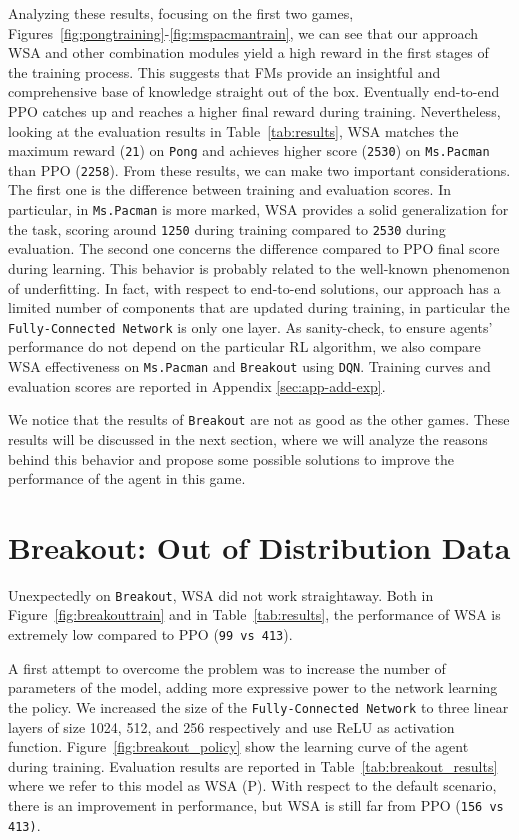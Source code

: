 Analyzing these results, focusing on the first two games, Figures~\ref{fig:pongtraining}-\ref{fig:mspacmantrain}, we can see that our approach WSA and other combination modules yield a high reward in the first stages of the training process.
This suggests that FMs provide an insightful and comprehensive base of knowledge straight out of the box.
Eventually end-to-end PPO catches up and reaches a higher final reward during training.
Nevertheless, looking at the evaluation results in Table~\ref{tab:results}, WSA matches the maximum reward (\texttt{21}) on \texttt{Pong} and achieves higher score (\texttt{2530}) on \texttt{Ms.Pacman} than PPO (\texttt{2258}).
From these results, we can make two important considerations.
The first one is the difference between training and evaluation scores.
In particular, in \texttt{Ms.Pacman} is more marked, WSA provides a solid generalization for the task, scoring around \texttt{1250} during training compared to \texttt{2530} during evaluation.
The second one concerns the difference compared to PPO final score during learning.
This behavior is probably related to the well-known phenomenon of underfitting.
In fact, with respect to end-to-end solutions, our approach has a limited number of components that are updated during training, in particular the \texttt{Fully-Connected Network} is only one layer.
As sanity-check, to ensure agents' performance do not depend on the particular RL algorithm, we also compare WSA effectiveness on \texttt{Ms.Pacman} and \texttt{Breakout} using \texttt{DQN}.
Training curves and evaluation scores are reported in Appendix \ref{sec:app-add-exp}.

We notice that the results of \texttt{Breakout} are not as good as the other games.
These results will be discussed in the next section, where we will analyze the reasons behind this behavior and propose some possible solutions to improve the performance of the agent in this game.



\section{Breakout: Out of Distribution Data}\label{sec:breakout_study}
Unexpectedly on \texttt{Breakout}, WSA did not work straightaway.
Both in Figure~\ref{fig:breakouttrain} and in Table~\ref{tab:results}, the performance of WSA is extremely low compared to PPO (\texttt{99 vs 413}).

A first attempt to overcome the problem was to increase the number of parameters of the model, adding more expressive power to the network learning the policy.
We increased the size of the \texttt{Fully-Connected Network} to three linear layers of size 1024, 512, and 256 respectively and use ReLU as activation function.
Figure~\ref{fig:breakout_policy} show the learning curve of the agent during training.
Evaluation results are reported in Table~\ref{tab:breakout_results} where we refer to this model as WSA (P).
With respect to the default scenario, there is an improvement in performance, but WSA is still far from PPO (\texttt{156 vs 413)}.

